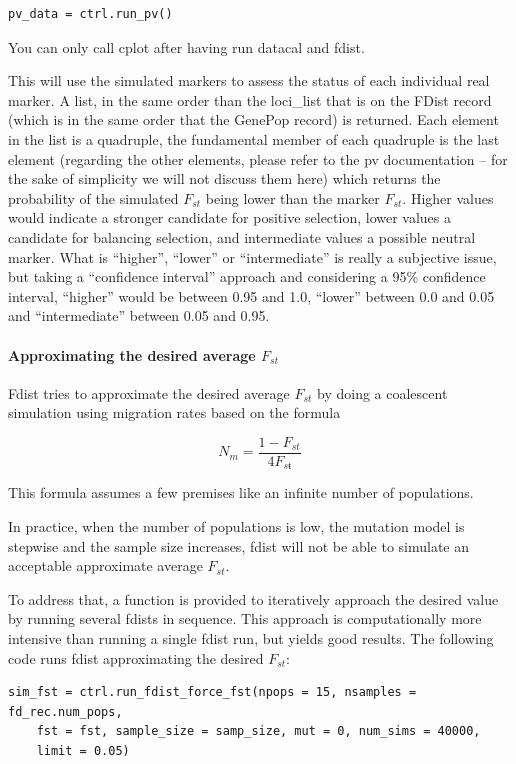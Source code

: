 \documentclass{report}
\begin{document}
\begin{verbatim}
pv_data = ctrl.run_pv()
\end{verbatim}

You can only call cplot after having run datacal and fdist.

This will use the simulated markers to assess the status of each
individual real marker. A list, in the same order than the loci\_list
that is on the FDist record (which is in the same order that the GenePop
record) is returned. Each element in the list is a quadruple, the
fundamental member of each quadruple is the last element (regarding the
other elements, please refer to the pv documentation -- for the
sake of simplicity we will not discuss them here) which returns the
probability of the simulated $F_{st}$ being lower than the marker $F_{st}$.
Higher values would indicate a stronger candidate for positive selection,
lower values a candidate for balancing selection, and intermediate values
a possible neutral marker. What is ``higher'', ``lower'' or ``intermediate''
is really a subjective issue, but taking a ``confidence interval'' approach
and considering a 95\% confidence interval, ``higher'' would be between 0.95
and 1.0, ``lower'' between 0.0 and 0.05 and ``intermediate'' between 0.05 and
0.95.



\paragraph{Approximating the desired average $F_{st}$}

Fdist tries to approximate the desired average $F_{st}$ by doing a
coalescent simulation using migration rates based on the formula

\[ N_{m} = \frac{1 - F_{st}}{4F_{sŧ}} \]

This formula assumes a few premises like an infinite number of populations.

In practice, when the number of populations is low, the mutation model
is stepwise and the sample size increases, fdist will not be able to
simulate an acceptable approximate average $F_{st}$.

To address that, a function is provided to iteratively approach the desired
value by running several fdists in sequence. This approach is computationally
more intensive than running a single fdist run, but yields good results.
The following code runs fdist approximating the desired $F_{st}$:

\begin{verbatim}
sim_fst = ctrl.run_fdist_force_fst(npops = 15, nsamples = fd_rec.num_pops,
    fst = fst, sample_size = samp_size, mut = 0, num_sims = 40000,
    limit = 0.05)
\end{verbatim}
\end{document}
